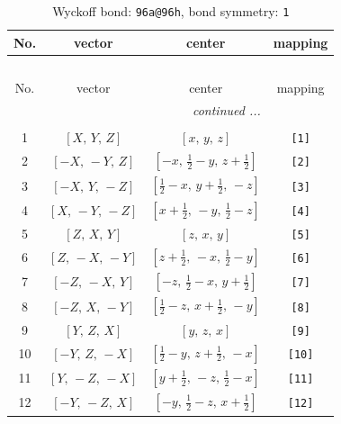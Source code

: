 \documentclass[fleqn,8pt]{jsarticle}
\begin{document}
\begin{longtable}{cccc}
\caption{Wyckoff bond: {\tt 96a@96h}, bond symmetry: {\tt 1}}
 \\
 \hline \hline
No. & vector & center & mapping \\ \hline \endfirsthead

\multicolumn{3}{l}{\tablename\ \thetable{}} \\
 \hline \hline
No. & vector & center & mapping \\ \hline \endhead

 \hline \hline
\multicolumn{3}{r}{\footnotesize\it continued ...} \\ \endfoot

 \hline \hline
\multicolumn{3}{r}{} \\ \endlastfoot

1 & $\left[ X,\, Y,\, Z \right]$ & $\left[ x,\, y,\, z \right]$ & {\tt [1]} \\ \hline
2 & $\left[ - X,\, - Y,\, Z \right]$ & $\left[ - x,\, \frac{1}{2} - y,\, z + \frac{1}{2} \right]$ & {\tt [2]} \\ \hline
3 & $\left[ - X,\, Y,\, - Z \right]$ & $\left[ \frac{1}{2} - x,\, y + \frac{1}{2},\, - z \right]$ & {\tt [3]} \\ \hline
4 & $\left[ X,\, - Y,\, - Z \right]$ & $\left[ x + \frac{1}{2},\, - y,\, \frac{1}{2} - z \right]$ & {\tt [4]} \\ \hline
5 & $\left[ Z,\, X,\, Y \right]$ & $\left[ z,\, x,\, y \right]$ & {\tt [5]} \\ \hline
6 & $\left[ Z,\, - X,\, - Y \right]$ & $\left[ z + \frac{1}{2},\, - x,\, \frac{1}{2} - y \right]$ & {\tt [6]} \\ \hline
7 & $\left[ - Z,\, - X,\, Y \right]$ & $\left[ - z,\, \frac{1}{2} - x,\, y + \frac{1}{2} \right]$ & {\tt [7]} \\ \hline
8 & $\left[ - Z,\, X,\, - Y \right]$ & $\left[ \frac{1}{2} - z,\, x + \frac{1}{2},\, - y \right]$ & {\tt [8]} \\ \hline
9 & $\left[ Y,\, Z,\, X \right]$ & $\left[ y,\, z,\, x \right]$ & {\tt [9]} \\ \hline
10 & $\left[ - Y,\, Z,\, - X \right]$ & $\left[ \frac{1}{2} - y,\, z + \frac{1}{2},\, - x \right]$ & {\tt [10]} \\ \hline
11 & $\left[ Y,\, - Z,\, - X \right]$ & $\left[ y + \frac{1}{2},\, - z,\, \frac{1}{2} - x \right]$ & {\tt [11]} \\ \hline
12 & $\left[ - Y,\, - Z,\, X \right]$ & $\left[ - y,\, \frac{1}{2} - z,\, x + \frac{1}{2} \right]$ & {\tt [12]} \\ \hline

\end{longtable}
\end{document}
